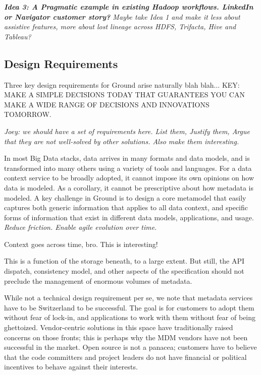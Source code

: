 \documentclass{sig-alternate}
\begin{document}
\emph{\textbf{Idea 3: A Pragmatic example in existing Hadoop workflows.  LinkedIn or Navigator customer story?}  Maybe take Idea 1 and make it less about assistive features, more about lost lineage across HDFS, Trifacta, Hive and Tableau?}

\subsection{Design Requirements}
Three key design requirements for Ground arise naturally blah blah... KEY: MAKE A SIMPLE DECISIONS TODAY 
THAT GUARANTEES YOU CAN MAKE A WIDE RANGE OF DECISIONS AND INNOVATIONS TOMORROW.

\emph{Joey: we should have a set of requirements here. List them, Justify them, Argue that they are not well-solved by other solutions.  Also make them interesting.}

 In most Big Data stacks, data arrives in many formats and data models, and is transformed into many others using a variety of tools and languages. For a data context service to be broadly adopted, it cannot impose its own opinions on how data is modeled. As a corollary, it cannot be prescriptive about how metadata is modeled. A key challenge in Ground is to design a core metamodel that easily captures both generic information that applies to all data context, and specific forms of information that exist in different data models, applications, and usage.  \emph{Reduce friction. Enable agile evolution over time.}

 Context goes across time, bro.  This is interesting!

  This is a function of the storage beneath, to a large extent. But still, the API dispatch, consistency model, and other aspects of the specification should not preclude the management of enormous volumes of metadata.

  While not a technical design requirement per se, we note that metadata services have to be Switzerland to be successful.  The goal is for customers to adopt them without fear of lock-in, and applications to work with them without fear of being ghettoized. Vendor-centric solutions in this space have traditionally raised concerns on those fronts; this is perhaps why the MDM vendors have not been successful in the market. Open source is not a panacea; customers have to believe that the code committers and project leaders do not have financial or political incentives to behave against their interests.  
\end{document}
